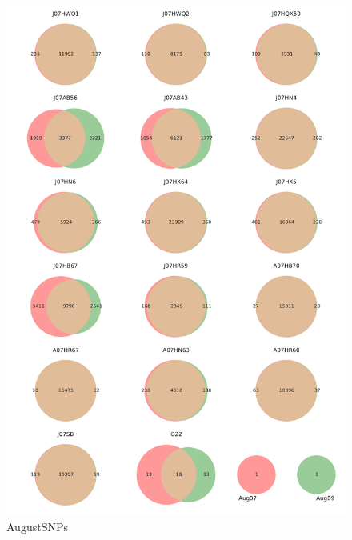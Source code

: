 \begin{figure}[!hbtp]
  \centering
  \includegraphics[width=\textwidth]{Chapter5/Figures/Venn_AugustSNPs.pdf}
  \caption{AugustSNPs}
  \label{VennAug}
\end{figure}


